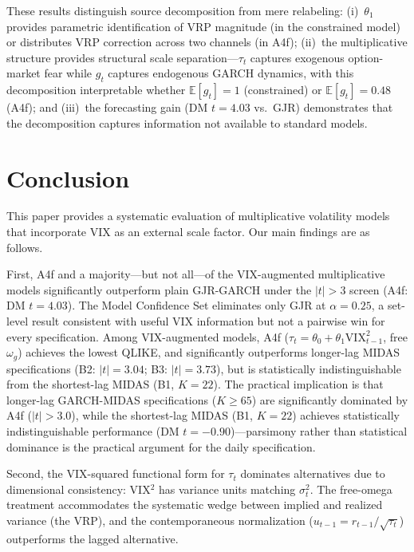 \documentclass[12pt,a4paper]{article}
\newcommand{\E}{\mathbb{E}}
\begin{document}
These results distinguish source decomposition from mere relabeling: (i)~$\theta_1$ provides parametric identification of VRP magnitude (in the constrained model) or distributes VRP correction across two channels (in A4f); (ii)~the multiplicative structure provides structural scale separation---$\tau_t$ captures exogenous option-market fear while $g_t$ captures endogenous GARCH dynamics, with this decomposition interpretable whether $\E[g_t]=1$ (constrained) or $\E[g_t]=0.48$ (A4f); and (iii)~the forecasting gain (DM $t = 4.03$ vs.\ GJR) demonstrates that the decomposition captures information not available to standard models.


\section{Conclusion}
\label{sec:conclusion}

This paper provides a systematic evaluation of multiplicative volatility models that incorporate VIX as an external scale factor. Our main findings are as follows.

First, A4f and a majority---but not all---of the VIX-augmented multiplicative models significantly outperform plain GJR-GARCH under the $|t|>3$ screen (A4f: DM $t = 4.03$). The Model Confidence Set eliminates only GJR at $\alpha = 0.25$, a set-level result consistent with useful VIX information but not a pairwise win for every specification. Among VIX-augmented models, A4f ($\tau_t = \theta_0 + \theta_1 \mathrm{VIX}_{t-1}^2$, free $\omega_g$) achieves the lowest QLIKE, and significantly outperforms longer-lag MIDAS specifications (B2: $|t| = 3.04$; B3: $|t| = 3.73$), but is statistically indistinguishable from the shortest-lag MIDAS (B1, $K=22$). The practical implication is that longer-lag GARCH-MIDAS specifications ($K \geq 65$) are significantly dominated by A4f ($|t| > 3.0$), while the shortest-lag MIDAS (B1, $K=22$) achieves statistically indistinguishable performance (DM $t = -0.90$)---parsimony rather than statistical dominance is the practical argument for the daily specification.

Second, the VIX-squared functional form for $\tau_t$ dominates alternatives due to dimensional consistency: VIX$^2$ has variance units matching $\sigma_t^2$. The free-omega treatment accommodates the systematic wedge between implied and realized variance (the VRP), and the contemporaneous normalization ($u_{t-1} = r_{t-1}/\sqrt{\tau_t}$) outperforms the lagged alternative.
\end{document}
